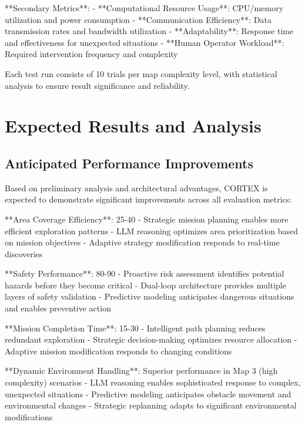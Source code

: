 **Secondary Metrics**:
- **Computational Resource Usage**: CPU/memory utilization and power consumption
- **Communication Efficiency**: Data transmission rates and bandwidth utilization
- **Adaptability**: Response time and effectiveness for unexpected situations
- **Human Operator Workload**: Required intervention frequency and complexity

Each test run consists of 10 trials per map complexity level, with statistical analysis to ensure result significance and reliability.

\section{Expected Results and Analysis}

\subsection{Anticipated Performance Improvements}

Based on preliminary analysis and architectural advantages, CORTEX is expected to demonstrate significant improvements across all evaluation metrics:

**Area Coverage Efficiency**: 25-40%
- Strategic mission planning enables more efficient exploration patterns
- LLM reasoning optimizes area prioritization based on mission objectives
- Adaptive strategy modification responds to real-time discoveries

**Safety Performance**: 80-90%
- Proactive risk assessment identifies potential hazards before they become critical
- Dual-loop architecture provides multiple layers of safety validation
- Predictive modeling anticipates dangerous situations and enables preventive action

**Mission Completion Time**: 15-30%
- Intelligent path planning reduces redundant exploration
- Strategic decision-making optimizes resource allocation
- Adaptive mission modification responds to changing conditions

**Dynamic Environment Handling**: Superior performance in Map 3 (high complexity) scenarios
- LLM reasoning enables sophisticated response to complex, unexpected situations
- Predictive modeling anticipates obstacle movement and environmental changes
- Strategic replanning adapts to significant environmental modifications

